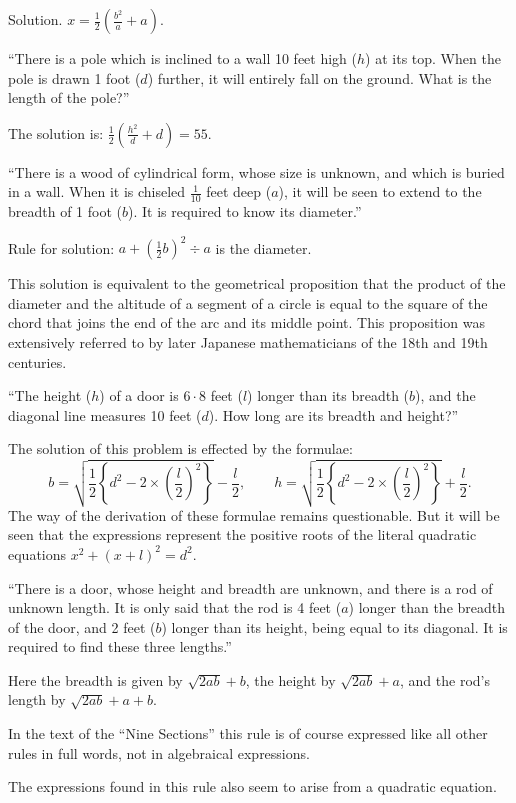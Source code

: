 \documentclass[11pt]{article}
\newcommand{\scanpage}[2]{\clearpage\setcounter{footnote}{0}\noindent{\footnotesize\color{gray}PDF page #1 · #2}\par\medskip}
\newcommand{\scanfooter}{}
\begin{document}
Solution. $x=\frac12\left(\frac{b^2}{a}+a\right)$.

``There is a pole which is inclined to a wall 10 feet high ($h$) at its top. When the pole is drawn 1 foot ($d$) further, it will entirely fall on the ground. What is the length of the pole?''

The solution is: $\frac12\left(\frac{h^2}{d}+d\right)=55$.

``There is a wood of cylindrical form, whose size is unknown, and which is buried in a wall. When it is chiseled $\frac1{10}$ feet deep ($a$), it will be seen to extend to the breadth of 1 foot ($b$). It is required to know its diameter.''

Rule for solution: $a+\left(\frac12 b\right)^2\div a$ is the diameter.

This solution is equivalent to the geometrical proposition that the product of the diameter and the altitude of a segment of a circle is equal to the square of the chord that joins the end of the arc and its middle point. This proposition was extensively referred to by later Japanese mathematicians of the 18th and 19th centuries.
\scanfooter

\scanpage{0037}{Chapter 3, printed page 23}
``The height ($h$) of a door is $6\cdot8$ feet ($l$) longer than its breadth ($b$), and the diagonal line measures 10 feet ($d$). How long are its breadth and height?''

The solution of this problem is effected by the formulae:
\[
b=\sqrt{\frac12\left\{d^2-2\times\left(\frac l2\right)^2\right\}}-\frac l2,
\qquad
h=\sqrt{\frac12\left\{d^2-2\times\left(\frac l2\right)^2\right\}}+\frac l2.
\]
The way of the derivation of these formulae remains questionable. But it will be seen that the expressions represent the positive roots of the literal quadratic equations $x^2+(x+l)^2=d^2$.

``There is a door, whose height and breadth are unknown, and there is a rod of unknown length. It is only said that the rod is 4 feet ($a$) longer than the breadth of the door, and 2 feet ($b$) longer than its height, being equal to its diagonal. It is required to find these three lengths.''

Here the breadth is given by $\sqrt{2ab}+b$, the height by $\sqrt{2ab}+a$, and the rod's length by $\sqrt{2ab}+a+b$.

In the text of the ``Nine Sections'' this rule is of course expressed like all other rules in full words, not in algebraical expressions.

The expressions found in this rule also seem to arise from a quadratic equation.
\end{document}
